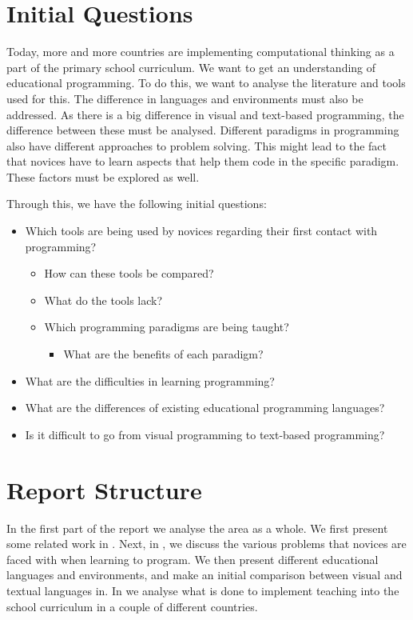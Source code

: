 \section{Initial Questions}
Today, more and more countries are implementing computational thinking as a part of the primary school curriculum. We want to get an understanding of educational programming. To do this, we want to analyse the literature and tools used for this. The difference in languages and environments must also be addressed. As there is a big difference in visual and text-based programming, the difference between these must be analysed. Different paradigms in programming also have different approaches to problem solving. This might lead to the fact that novices have to learn aspects that help them code in the specific paradigm. These factors must be explored as well.

Through this, we have the following initial questions:

\begin{itemize}
  \item Which tools are being used by novices regarding their first contact with programming?
  \begin{itemize}
    \item How can these tools be compared?
    \item What do the tools lack?
    \item Which programming paradigms are being taught?
    \begin{itemize}
      \item What are the benefits of each paradigm?
    \end{itemize}
  \end{itemize}
  \item What are the difficulties in learning programming?

  \item What are the differences of existing educational programming languages?
  \item Is it difficult to go from visual programming to text-based programming?
\end{itemize}

\section{Report Structure}
In the first part of the report we analyse the area as a whole. We first present some related work in . Next, in , we discuss the various problems that novices are faced with when learning to program. We then present different educational languages and environments, and make an initial comparison between visual and textual languages in. In  we analyse what is done to implement teaching into the school curriculum in a couple of different countries.

